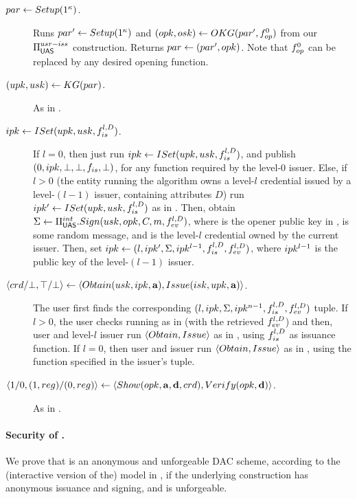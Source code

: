 \begin{description}
\item[$par \gets Setup(1^\kappa)$.]  Runs $par' \gets Setup(1^\kappa)$
  and $(opk,osk) \gets OKG(par',f_{op}^0)$ from our
  $\Pi_{\mathsf{UAS}}^{usr-iss}$ construction. Returns $par \gets (par',opk)$. Note
  that $f_{op}^0$ can be replaced by any desired opening function.
\item[$(upk,usk) \gets KG(par)$.] As in \CUASGenInt.
\item[$ipk \gets ISet(upk,usk,f_{is}^{l,D})$.] If $l = 0$, then just
  run $ipk \gets ISet(upk,usk,f_{is}^{l,D})$, and publish $(0,ipk,\bot,
  \bot,f_{is},\bot)$, for any \fissue function required by the level-$0$
  issuer. Else,  
  if $l > 0$ (the entity running the algorithm owns a level-$l$ credential
  issued by a level-$(l-1)$ issuer, containing attributes $D$) run $ipk' \gets
  ISet(upk,usk,f_{is}^{l,D})$ as in \CUASGenInt. Then, obtain $\Sigma \gets
  \Pi_{\mathsf{UAS}}^{int}.Sign(usk,opk,C,m,f_{ev}^{l,D})$, where \opk is the
  opener public key in \parm, \msg is some random message, and \Cred is the
  level-$l$ credential owned by the current issuer. Then, set
  $ipk \gets (l,ipk',\Sigma,ipk^{l-1},f_{is}^{l,D},f_{ev}^{l,D})$, where
  $ipk^{l-1}$ is the public key of the level-$(l-1)$ issuer.
\item[$\langle crd/\bot,\top/\bot \rangle \gets
  \langle Obtain(usk,ipk,\mathbf{a}),Issue(isk,upk,\mathbf{a}) \rangle$.]
  The user first finds the corresponding $(l,ipk,\Sigma,ipk^{n-1},f_{is}^{l,D},
  f_{ev}^{l,D})$ tuple. If $l>0$, the user checks \Sig running \Verify as in
  \CUASGenInt (with the retrieved $f_{ev}^{l,D}$) and then, user and level-$l$
  issuer run $\langle Obtain,Issue\rangle$ as in \CUASGenInt, using
  $f_{is}^{l,D}$ as issuance function. If $l=0$, then user and issuer
  run $\langle Obtain,Issue\rangle$ as in \CUASGenInt, using the \fissue
  function specified in the issuer's tuple.
\item[$\langle 1/0,(1,reg)/(0,reg)\rangle
  \gets \langle Show(opk,\mathbf{a},\mathbf{d},crd),
  Verify(opk,\mathbf{d}) \rangle$.] As in \CUASGenInt.
\end{description}

\paragraph{Security of \CUASDAC.} %
We prove that \CUASDAC is an anonymous and unforgeable DAC scheme, according to
the (interactive version of the) model in , if the
underlying \CUASGenInt construction has anonymous issuance and signing, and is
unforgeable.

